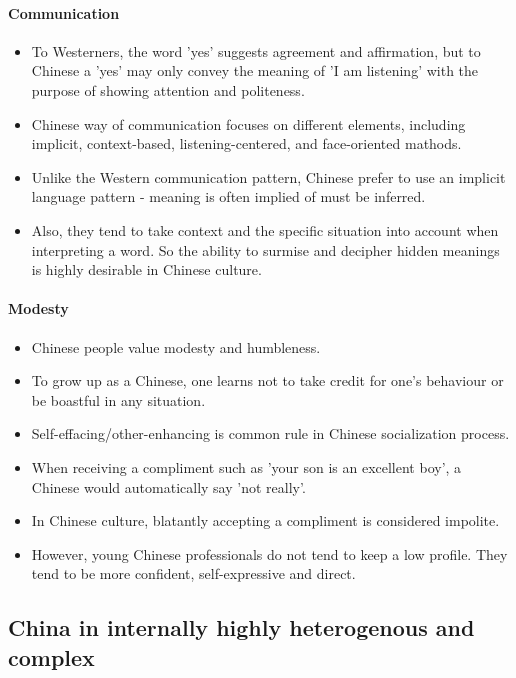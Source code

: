 \paragraph{Communication}

\begin{itemize}
    \item To Westerners, the word 'yes' suggests agreement and affirmation, but
        to Chinese a 'yes' may only convey the meaning of 'I am listening' with
        the purpose of showing attention and politeness.
    \item Chinese way of communication focuses on different elements, including
        implicit, context-based, listening-centered, and face-oriented mathods.
    \item Unlike the Western communication pattern, Chinese prefer to use an
        implicit language pattern - meaning is often implied of must be inferred.
    \item Also, they tend to take context and the specific situation into account
        when interpreting a word. So the ability to surmise and decipher hidden
        meanings is highly desirable in Chinese culture.
\end{itemize}

\paragraph{Modesty}

\begin{itemize}
    \item Chinese people value modesty and humbleness.
    \item To grow up as a Chinese, one learns not to take credit for one's
        behaviour or be boastful in any situation.
    \item Self-effacing/other-enhancing is common rule in Chinese socialization process.
    \item When receiving a compliment such as 'your son is an excellent boy',
        a Chinese would automatically say 'not really'.
    \item In Chinese culture, blatantly accepting a compliment is considered impolite.
    \item However, young Chinese professionals do not tend to keep a low profile.
        They tend to be more confident, self-expressive and direct.
\end{itemize}


\subsection{China in internally highly heterogenous and complex}

